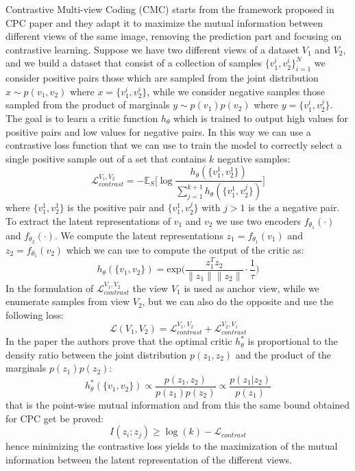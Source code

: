 Contrastive Multi-view Coding (CMC) \cite{tian2020contrastive} starts from the framework proposed in CPC paper and they adapt it to maximize the mutual information between different views of the same image, removing the prediction part and focusing on contrastive learning. Suppose we have two different views of a dataset $V_1$ and $V_2$, and we build a dataset that consist of a collection of samples $\{v_1^i, v_2^i\}_{i=1}^N$ we consider positive pairs those which are sampled from the joint distribution $x \sim p(v_1, v_2)$ where $x= \{v_1^i, v_2^i\}$, while we consider negative samples those sampled from the product of marginals $y \sim p(v_1)p(v_2)$ where $y = \{v_1^i, v_2^j\}$. The goal is to learn a critic function $h_\theta$ which is trained to output high values for positive pairs and low values for negative pairs. In this way we can use a contrastive loss function that we can use to train the model to correctly select a single positive sample out of a set that contains $k$ negative samples:
\[\mathcal{L}^{V_1, V_2}_{contrast} = -\mathbb{E}_S \Bigg[ \log \frac{h_\theta(\{v_1^1, v_2^1 \})}{\sum_{j=1}^{k+1}h_\theta(\{v_1^1, v_2^j \})}  \Bigg] \]
where $\{v_1^1, v_2^1 \}$ is the positive pair and $\{v_1^1, v_2^j \}$ with $j > 1$ is the a negative pair. To extract the latent representations of $v_1$ and $v_2$ we use two encoders $f_{\theta_1}(\cdot)$ and $f_{\theta_2}(\cdot)$. We compute the latent representations $z_1 = f_{\theta_1}(v_1)$ and $z_2 = f_{\theta_1}(v_2)$ which we can use to compute the output of the critic as:
\[ h_\theta(\{v_1, v_2\}) = \text{exp}\Bigg(\frac{z_1^Tz_2}{\lVert z_1\rVert \lVert z_2\rVert}\cdot \frac{1}{\tau}\Bigg) \]
In the formulation of $\mathcal{L}^{V_1, V_2}_{contrast}$ the view $V_1$ is used as anchor view, while we enumerate samples from view $V_2$, but we can also do the opposite and use the following loss:
\[ \mathcal{L}(V_1, V_2) = \mathcal{L}^{V_1, V_2}_{contrast} + \mathcal{L}^{V_2, V_1}_{contrast} \]
In the paper the authors prove that the optimal critic $h^*_\theta$ is proportional to the density ratio between the joint distribution $p(z_1, z_2)$ and the product of the marginals $p(z_1)p(z_2)$:
\[ h^*_\theta(\{ v_1,v_2\}) \propto \frac{p(z_1, z_2)}{p(z_1)p(z_2)} \propto \frac{p(z_1|z_2)}{p(z_1)} \]
that is the point-wise mutual information and from this the same bound obtained for CPC get be proved:
\[I(z_i;z_j) \ge \log(k) - \mathcal{L}_{contrast} \]
hence minimizing the contrastive loss yields to the maximization of the mutual information between the latent representation of the different views. 

